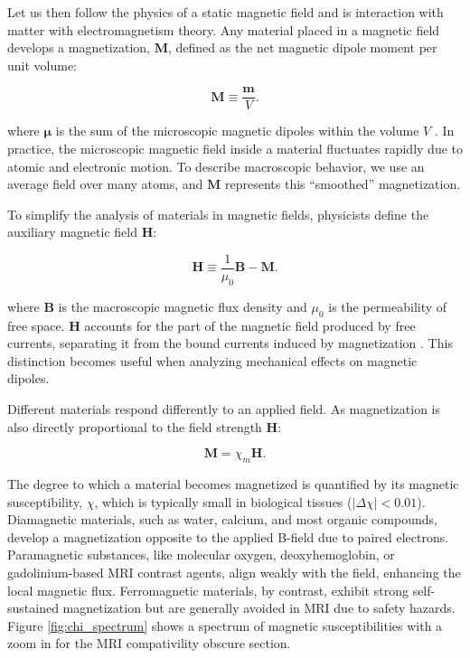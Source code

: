  Let us then follow the physics of a static magnetic field and is interaction with matter with electromagnetism theory. Any material placed in a magnetic field develops a magnetization, $\mathbf{M}$, defined as the net magnetic dipole moment per unit volume:

\begin{equation}
	\mathbf{M} \equiv \frac{\boldsymbol{m}}{V}.
	\label{eq:magnetization}
\end{equation}

\noindent where $\boldsymbol{\mu}$ is the sum of the microscopic magnetic dipoles within the volume $V$ \cite{griffiths2013electrodynamics}. In practice, the microscopic magnetic field inside a material fluctuates rapidly due to atomic and electronic motion. To describe macroscopic behavior, we use an average field over many atoms, and $\mathbf{M}$ represents this ``smoothed'' magnetization.

To simplify the analysis of materials in magnetic fields, physicists define the auxiliary magnetic field $\mathbf{H}$:

\begin{equation}
	\mathbf{H} \equiv \frac{1}{\mu_0} \mathbf{B} - \mathbf{M}.
	\label{eq:Hfield}
\end{equation}

\noindent where $\mathbf{B}$ is the macroscopic magnetic flux density and $\mu_0$ is the permeability of free space. $\mathbf{H}$ accounts for the part of the magnetic field produced by free currents, separating it from the bound currents induced by magnetization \cite{griffiths2013electrodynamics}. This distinction becomes useful when analyzing mechanical effects on magnetic dipoles.

Different materials respond differently to an applied field. As magnetization is also directly proportional to the field strength $\mathbf{H}$:

\begin{equation}
	\mathbf{M} = \chi_m \mathbf{H}.
	\label{eq:magnetizationproportion}
\end{equation}

\noindent The degree to which a material becomes magnetized is quantified by its magnetic susceptibility, $\chi$, which is typically small in biological tissues ($|\Delta \chi| < 0.01$). Diamagnetic materials, such as water, calcium, and most organic compounds, develop a magnetization opposite to the applied B-field due to paired electrons. Paramagnetic substances, like molecular oxygen, deoxyhemoglobin, or gadolinium-based MRI contrast agents, align weakly with the field, enhancing the local magnetic flux. Ferromagnetic materials, by contrast, exhibit strong self-sustained magnetization but are generally avoided in MRI due to safety hazards. Figure \ref{fig:chi_spectrum} shows a spectrum of magnetic susceptibilities with a zoom in for the MRI compativility obscure section.
 

